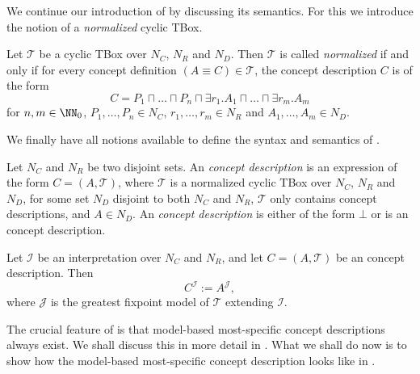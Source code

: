 We continue our introduction of \ELgfpbot by discussing its semantics.  For this we
introduce the notion of a \emph{normalized} cyclic TBox.

\begin{Definition}
  \label{def:normalized-cyclic-TBox}
  Let $\mathcal{T}$ be a cyclic TBox over $N_C$, $N_R$ and $N_D$.  Then $\mathcal{T}$ is
  called \emph{normalized} if and only if for every concept definition $(A \equiv C) \in
  \mathcal{T}$, the concept description $C$ is of the form
  \begin{equation*}
    C = P_1 \sqcap \dots \sqcap P_n \sqcap \exists r_1. A_1 \sqcap \dots \sqcap \exists r_m. A_m
  \end{equation*}
  for $n, m \in \NN_0$, $P_1, \dots, P_n \in N_C$, $r_1, \dots, r_m \in N_R$ and $A_1,
  \dots, A_m \in N_D$.
\end{Definition}

We finally have all notions available to define the syntax and semantics of \ELgfpbot.

\begin{Definition}
  \label{def:ELgfpbot-concept-descriptions-and-their-semantics}
  Let $N_C$ and $N_R$ be two disjoint sets.  An \emph{\ELgfp concept description} is an
  expression of the form $C = (A, \mathcal{T})$, where $\mathcal{T}$ is a normalized
  cyclic TBox over $N_C$, $N_R$ and $N_D$, for some set $N_D$ disjoint to both $N_C$ and
  $N_R$, $\mathcal{T}$ only contains \EL concept descriptions, and $A \in N_D$.  An
  \emph{\ELgfpbot concept description} is either of the form $\bot$ or is an \ELgfp
  concept description.

  Let $\mathcal{I}$ be an interpretation over $N_{C}$ and $N_{R}$, and let $C = (A,
  \mathcal{T})$ be an \ELgfpbot concept description.  Then
  \begin{equation*}
    C^{\mathcal{I}} := A^{\mathcal{J}},
  \end{equation*}
  where $\mathcal{J}$ is the greatest fixpoint model of $\mathcal{T}$ extending
  $\mathcal{I}$.
\end{Definition}

The crucial feature of \ELgfpbot is that model-based most-specific concept descriptions
always exist.  We shall discuss this in more detail in .  What we
shall do now is to show how the model-based most-specific concept description looks like
in .

